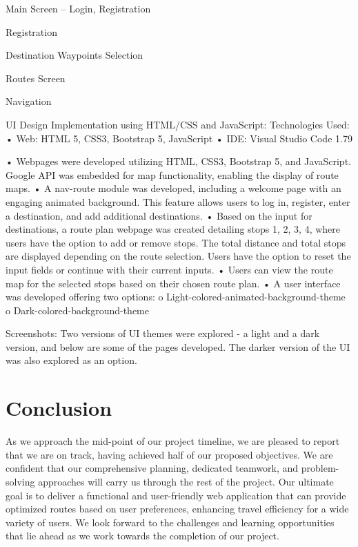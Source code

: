 \documentclass{article}
\begin{document}
Main Screen – Login, Registration
 
Registration
 




Destination Waypoints Selection
 
Routes Screen
 




Navigation
 
UI Design Implementation using HTML/CSS and JavaScript:
Technologies Used: 
•	Web: HTML 5, CSS3, Bootstrap 5, JavaScript
•	IDE: Visual Studio Code 1.79

•	Webpages were developed utilizing HTML, CSS3, Bootstrap 5, and JavaScript. Google API was embedded for map functionality, enabling the display of route maps. 
•	A nav-route module was developed, including a welcome page with an engaging animated background. This feature allows users to log in, register, enter a destination, and add additional destinations.
•	Based on the input for destinations, a route plan webpage was created detailing stops 1, 2, 3, 4, where users have the option to add or remove stops. The total distance and total stops are displayed depending on the route selection. Users have the option to reset the input fields or continue with their current inputs.
•	Users can view the route map for the selected stops based on their chosen route plan.
•	A user interface was developed offering two options:
o	Light-colored-animated-background-theme
o	Dark-colored-background-theme



Screenshots: 
Two versions of UI themes were explored - a light and a dark version, and below are some of the pages developed. The darker version of the UI was also explored as an option.

\section{Conclusion}
As we approach the mid-point of our project timeline, we are pleased to report that we are on track, having achieved half of our proposed objectives. We are confident that our comprehensive planning, dedicated teamwork, and problem-solving approaches will carry us through the rest of the project. Our ultimate goal is to deliver a functional and user-friendly web application that can provide optimized routes based on user preferences, enhancing travel efficiency for a wide variety of users. We look forward to the challenges and learning opportunities that lie ahead as we work towards the completion of our project.


\end{document}

